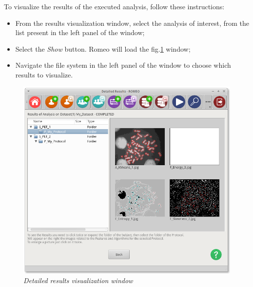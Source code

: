 \pagebreak
To visualize the results of the executed analysis, follow these instructions:
\begin{itemize}
\item From the results visualization window, select the analysis of interest, from the list present in the left panel of the window;
\item Select the \textit{Show} button. Romeo will load the fig.\ref{detailedresults} window;
\item Navigate the file system in the left panel of the window to choose which results to visualize.
\end{itemize}
\begin{figure}[!h]
\begin{center}
\includegraphics[scale=0.4]{./Images/ShowResults}
\caption{\textit{Detailed results visualization window}}
\label{detailedresults}
\end{center}
\end{figure}